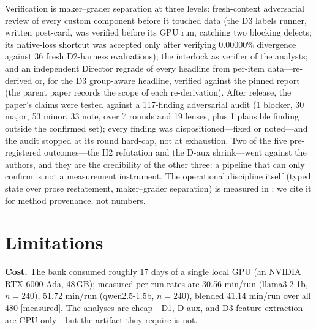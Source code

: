 \documentclass{article}
\begin{document}
Verification is maker--grader separation at three levels: fresh-context
adversarial review of every custom component before it touched data (the
D3 labels runner, written post-card, was verified before its GPU run,
catching two blocking defects; its native-loss shortcut was accepted only
after verifying 0.00000\% divergence against 36 fresh D2-harness
evaluations); the interlock as verifier of the analysts; and an independent
Director regrade of every headline from per-item data---re-derived or, for
the D3 group-aware headline, verified against the pinned report (the
parent paper records the scope of each re-derivation). After release, the
paper's claims were tested against a 117-finding adversarial audit
(1 blocker, 30 major, 53 minor, 33 note, over 7 rounds and 19 lenses, plus
1 plausible finding outside the confirmed set); every finding was
dispositioned---fixed or noted---and the audit stopped at its round
hard-cap, not at exhaustion. Two of the five pre-registered outcomes---the
H2 refutation and the D-aux shrink---went against the authors, and they are
the credibility of the other three: a pipeline that can only confirm is not
a measurement instrument. The operational discipline itself (typed state
over prose restatement, maker--grader separation) is measured in
\cite{bielec2026typedstate}; we cite it for method provenance, not numbers.

\section{Limitations}
\label{sec:limitations}

\textbf{Cost.} The bank consumed roughly 17 days of a single local GPU
(an NVIDIA RTX 6000 Ada, 48\,GB); measured per-run rates are 30.56 min/run
(llama3.2-1b, $n = 240$), 51.72 min/run (qwen2.5-1.5b, $n = 240$), blended
41.14 min/run over all 480 [measured]. The analyses are cheap---D1, D-aux,
and D3 feature extraction are CPU-only---but the artifact they require is
not.
\end{document}
